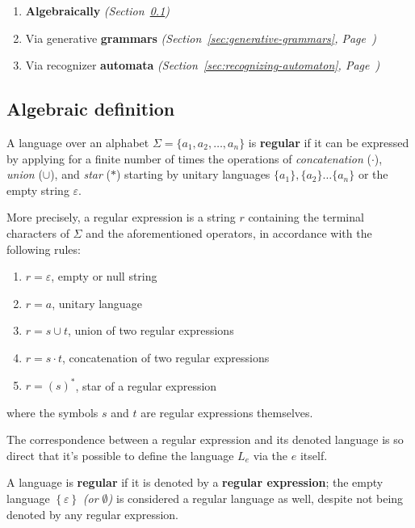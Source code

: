 \documentclass[english]{article}
\begin{document}
\begin{enumerate}
  \item \textbf{Algebraically} \textit{(Section~\ref{sec:reglang-algebraic})}
  \item Via generative \textbf{grammars} \textit{(Section~\ref{sec:generative-grammars}, Page~\pageref{sec:generative-grammars})}
  \item Via recognizer \textbf{automata} \textit{(Section~\ref{sec:recognizing-automaton}, Page~\pageref{sec:recognizing-automaton})}
\end{enumerate}

\subsection{Algebraic definition}
\label{sec:reglang-algebraic}

A language over an alphabet \(\Sigma = \{a_1, a_2, \ldots, a_n\}\) is \textbf{regular} if it can be expressed by applying for a finite number of times the operations of \textit{concatenation} (\(\cdot\)), \textit{union} (\(\cup\)), and \textit{star} (\(\ast\)) starting by unitary languages \(\{a_1\}, \{a_2\} \ldots \{a_n\}\) or the empty string \(\varepsilon\).

More precisely, a regular expression is a string \(r\) containing the terminal characters of \(\Sigma\) and the aforementioned operators, in accordance with the following rules:

\begin{enumerate}
  \item \(r = \varepsilon\), empty or null string
  \item \(r = a\), unitary language
  \item \(r = s \cup t\), union of two regular expressions
  \item \(r = s \cdot t\), concatenation of two regular expressions
  \item \(r = (s)^\ast\), star of a regular expression
\end{enumerate}

where the symbols \(s\) and \(t\) are regular expressions themselves.

\bigskip
The correspondence between a regular expression and its denoted language is so direct that it's possible to define the language \(L_e\) via the \re \(e\) itself.

A language is \textbf{regular} if it is denoted by a \textbf{regular expression};
the empty language \(\left\{ \varepsilon \right\}\) \textit{(or \(\emptyset\))} is considered a regular language as well, despite not being denoted by any regular expression.
\end{document}
